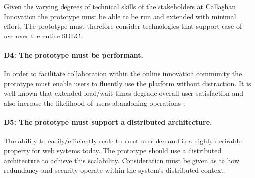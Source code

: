 Given the varying degrees of technical skills of the stakeholders at Callaghan Innovation the prototype must be able to be run and extended with minimal effort. The prototype must therefore consider technologies that support ease-of-use over the entire SDLC.

\paragraph{D4: The prototype must be performant.}

In order to facilitate collaboration within the online innovation community the prototype must enable users to fluently use the platform without distraction. It is well-known that extended load/wait times degrade overall user satisfaction and also increase the likelihood of users abandoning operations \cite{SiteSpeed1:online}\cite{TheAverage:online}\cite{HowL7:online}.

\paragraph{D5: The prototype must support a distributed architecture.}

The ability to easily/efficiently scale to meet user demand is a highly desirable property for web systems today. The prototype should use a distributed architecture to achieve this scalability. Consideration must be given as to how redundancy and security operate within the system's distributed context.

